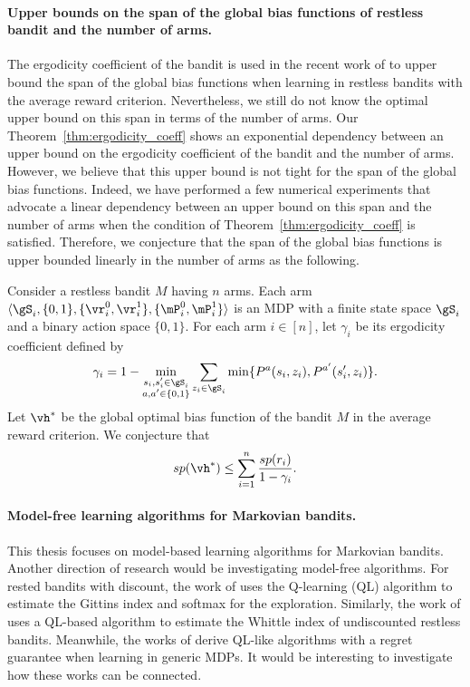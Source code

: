 \paragraph{Upper bounds on the span of the global bias functions of restless bandit and the number of arms.}
The ergodicity coefficient of the bandit is used in the recent work of \cite{akbarzadeh2022learning} to upper bound the span of the global bias functions when learning in restless bandits with the average reward criterion.
Nevertheless, we still do not know the optimal upper bound on this span in terms of the number of arms. 
Our Theorem~\ref{thm:ergodicity_coeff} shows an exponential dependency between an upper bound on the ergodicity coefficient of the bandit and the number of arms.
However, we believe that this upper bound is not tight for the span of the global bias functions.
Indeed, we have performed a few numerical experiments that advocate a linear dependency between an upper bound on this span and the number of arms when the condition of Theorem~\ref{thm:ergodicity_coeff} is satisfied.
Therefore, we conjecture that the span of the global bias functions is upper bounded linearly in the number of arms as the following.
\begin{conj}
    \label{conj:span}
    Consider a restless bandit $M$ having $n$ arms.
    Each arm $\langle\gS_i,\{0,1\},\{\vr^0_i,\vr^1_i\},\{\mP^0_i,\mP^1_i\}\rangle$ is an MDP with a finite state space $\gS_i$ and a binary action space $\{0,1\}$.
    For each arm $i\in[n]$, let $\gamma_i$ be its ergodicity coefficient defined by
    \begin{align*}
        \gamma_i = 1-\min_{\substack{s_i,s'_i\in\gS_i \\a,a'\in\{0,1\}}} \sum_{z_i\in\gS_i} \min\{P^a(s_i,z_i), P^{a'}(s'_i, z_i)\}.
    \end{align*}
    Let $\vh^*$ be the global optimal bias function of the bandit $M$ in the average reward criterion.
    We conjecture that
    \begin{align*}
        sp(\vh^*) \le \sum_{i=1}^n\frac{sp(r_i)}{1-\gamma_i}.
    \end{align*}
\end{conj}

\paragraph{Model-free learning algorithms for Markovian bandits.}
This thesis focuses on model-based learning algorithms for Markovian bandits. 
Another direction of research would be investigating model-free algorithms.
For rested bandits with discount, the work of \cite{duff1995q} uses the Q-learning (QL) algorithm to estimate the Gittins index and softmax for the exploration.
Similarly, the work of \cite{avrachenkov2022whittle} uses a QL-based algorithm to estimate the Whittle index of undiscounted restless bandits.
Meanwhile, the works of \cite{jin2018q, wei2020model} derive QL-like algorithms with a regret guarantee when learning in generic MDPs.
It would be interesting to investigate how these works can be connected.

